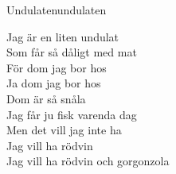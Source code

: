 \begin{song}{Undulaten}{undulaten}
\begin{vers}
Jag är en liten undulat\\
Som får så dåligt med mat\\
För dom jag bor hos\\
Ja dom jag bor hos\\
Dom är så snåla\\
Jag får ju fisk varenda dag\\
Men det vill jag inte ha\\
Jag vill ha rödvin\\
Jag vill ha rödvin och gorgonzola\\
\end{vers}
\end{song}
